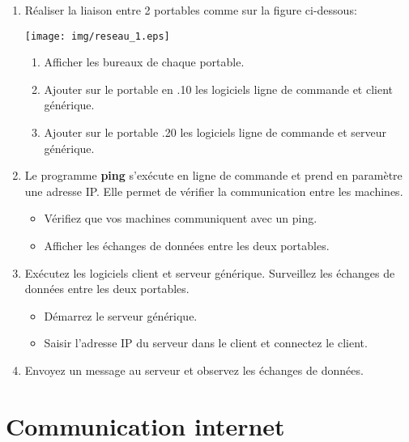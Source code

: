 \documentclass[12pt,a4paper]{article}
\begin{document}
\begin{enumerate}
\item Réaliser la liaison entre 2 portables comme sur la figure ci-dessous:

\begin{center}
\texttt{[image: img/reseau\_1.eps]}
\end{center}

\begin{enumerate}
\item Afficher les bureaux de chaque portable.
\item Ajouter sur le portable en .10 les logiciels ligne de commande et client générique.
\item Ajouter sur le portable .20 les logiciels ligne de commande et serveur générique.
\end{enumerate}
\item Le programme \textbf{ping} s'exécute en ligne de commande et prend en paramètre une adresse IP. Elle permet de vérifier la communication entre les machines.
\begin{itemize}
\item Vérifiez que vos machines communiquent avec un \textsf{ping}.
\item Afficher les échanges de données entre les deux portables.
\end{itemize} \vspace{4cm}

\newpage
\item Exécutez les logiciels client et serveur générique. Surveillez les échanges de données entre les deux portables.
\begin{itemize}
\item Démarrez le serveur générique.
\item Saisir l'adresse IP du serveur dans le client et connectez le client.
\end{itemize} \vspace{6cm}

\item Envoyez un message au serveur et observez les échanges de données. \vspace{6cm}

\end{enumerate}


\section*{Communication internet}
\end{document}
